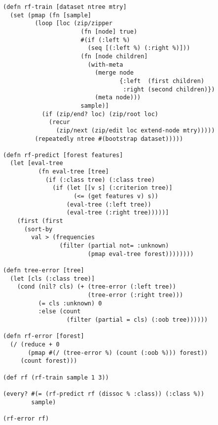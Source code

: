 \documentclass[a4paper,man,12pt,apacite,floatsintext,draftfirst]{apa6} %
\begin{document}
\begin{framed}
\begin{verbatim}
(defn rf-train [dataset ntree mtry]
  (set (pmap (fn [sample]
         (loop [loc (zip/zipper
                      (fn [node] true)
                      #(if (:left %)
                        (seq [(:left %) (:right %)]))
                      (fn [node children]
                        (with-meta
                          (merge node
                                 {:left  (first children)
                                  :right (second children)})
                          (meta node)))
                      sample)]
           (if (zip/end? loc) (zip/root loc)
             (recur
               (zip/next (zip/edit loc extend-node mtry)))))
         (repeatedly ntree #(bootstrap dataset)))))

(defn rf-predict [forest features]
  (let [eval-tree
          (fn eval-tree [tree]
            (if (:class tree) (:class tree)
              (if (let [[v s] (:criterion tree)]
                    (<= (get features v) s))
                  (eval-tree (:left tree))
                  (eval-tree (:right tree)))))]
    (first (first
      (sort-by
        val > (frequencies
                (filter (partial not= :unknown)
                        (pmap eval-tree forest))))))))

(defn tree-error [tree]
  (let [cls (:class tree)]
    (cond (nil? cls) (+ (tree-error (:left tree))
                        (tree-error (:right tree)))
          (= cls :unknown) 0
          :else (count
                  (filter (partial = cls) (:oob tree))))))

(defn rf-error [forest]
  (/ (reduce + 0
       (pmap #(/ (tree-error %) (count (:oob %))) forest))
     (count forest)))

(def rf (rf-train sample 1 3))

(every? #(= (rf-predict rf (dissoc % :class)) (:class %))
        sample)

(rf-error rf)

\end{verbatim}
\end{framed}
\end{document}
